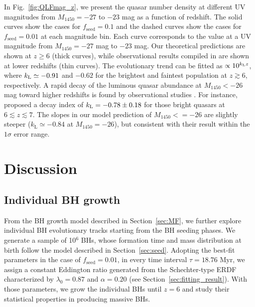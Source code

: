 \documentclass[twocolumn, twocolappendix]{aastex63}
\newcommand{\tlife}{\tau}
\newcommand{\fseed}{f_\mathrm{seed}}
\newcommand{\Muv}{M_{1450}}
\begin{document}
\begin{CJK*}{UTF8}{gbsn}
In Fig.~\ref{fig:QLFmag_z}, we present the quasar number density at different UV magnitudes from $\Muv=-27$ to $-23$ mag as a function of redshift.
The solid curves show the cases for $\fseed = 0.1$ and the dashed curves show the cases for $\fseed = 0.01$ at each magnitude bin.
Each curve corresponds to the value at a UV magnitude from $\Muv=-27$ mag to $-23$ mag.
Our theoretical predictions are shown at $z\geq 6$ (thick curves),
while observational results compiled in \cite{2020ApJ...904...89N} are shown at lower redshifts (thin curves).
The evolutionary trend can be fitted as $\propto 10^{k_{\rm L}z}$,
where $k_{\rm L}\simeq -0.91$ and $-0.62$ for the brightest and faintest population
at $z\gtrsim 6$, respectively.
A rapid decay of the luminous quasar abundance at $\Muv<-26$ mag toward higher redshifts is found by 
observational studies \citep[e.g.,][]{2001AJ....122.2833F,2013ApJ...768..105M,2016ApJ...833..222J,2019ApJ...884...30W}.
For instance, \citet{2019ApJ...884...30W} proposed a decay index of $k_{\rm L}=-0.78\pm{0.18}$ for those bright quasars at $6\lesssim z \lesssim 7$.
The slopes in our model prediction of $\Muv <=-26$ are slightly steeper ($k_\mathrm{L} \simeq -0.84$ at $\Muv=-26$),
but consistent with their result within the $1\sigma$ error range.


\vspace{2mm}
\section{Discussion}\label{sec:discussion}
\vspace{2mm}
\subsection{Individual BH growth}\label{sec:evol}

From the BH growth model described in Section~\ref{sec:MF}, we further explore individual BH evolutionary tracks starting from the BH seeding phases.
We generate a sample of 10$^6$ BHs, whose formation time and mass distribution at birth follow the model described in Section~\ref{sec:seed}. 
Adopting the best-fit parameters in the case of $\fseed = 0.01$, in every time interval $\tlife=18.76$ Myr,
we assign a constant Eddington ratio generated from the Schechter-type ERDF characterized by $\lambda_0=0.87$ and $\alpha=0.20$ 
(see Section~\ref{sec:fitting_result}).
With those parameters, we grow the individual BHs until $z=6$ and study their statistical properties in producing massive BHs.



\end{CJK*}
\end{document}
